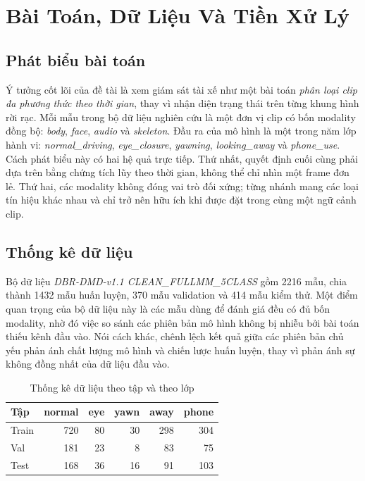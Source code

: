 \documentclass[conference,a4paper]{IEEEtran}
\begin{document}
\section[Bai Toan Du Lieu Va Tien Xu Ly]{Bài Toán, Dữ Liệu Và Tiền Xử Lý}
\subsection{Phát biểu bài toán}
Ý tưởng cốt lõi của đề tài là xem giám sát tài xế như một bài toán \textit{phân loại clip đa phương thức theo thời gian}, thay vì nhận diện trạng thái trên từng khung hình rời rạc. Mỗi mẫu trong bộ dữ liệu nghiên cứu là một đơn vị clip có bốn modality đồng bộ: \textit{body}, \textit{face}, \textit{audio} và \textit{skeleton}. Đầu ra của mô hình là một trong năm lớp hành vi: \textit{normal\_driving}, \textit{eye\_closure}, \textit{yawning}, \textit{looking\_away} và \textit{phone\_use}. Cách phát biểu này có hai hệ quả trực tiếp. Thứ nhất, quyết định cuối cùng phải dựa trên bằng chứng tích lũy theo thời gian, không thể chỉ nhìn một frame đơn lẻ. Thứ hai, các modality không đóng vai trò đối xứng; từng nhánh mang các loại tín hiệu khác nhau và chỉ trở nên hữu ích khi được đặt trong cùng một ngữ cảnh clip.

\subsection{Thống kê dữ liệu}
Bộ dữ liệu \textit{DBR-DMD-v1.1 CLEAN\_FULLMM\_5CLASS} gồm 2216 mẫu, chia thành 1432 mẫu huấn luyện, 370 mẫu validation và 414 mẫu kiểm thử. Một điểm quan trọng của bộ dữ liệu này là các mẫu dùng để đánh giá đều có đủ bốn modality, nhờ đó việc so sánh các phiên bản mô hình không bị nhiễu bởi bài toán thiếu kênh đầu vào. Nói cách khác, chênh lệch kết quả giữa các phiên bản chủ yếu phản ánh chất lượng mô hình và chiến lược huấn luyện, thay vì phản ánh sự không đồng nhất của dữ liệu đầu vào.

\begin{table}[t]
\caption{Thống kê dữ liệu theo tập và theo lớp}
\label{tab:data-stats}
\centering
\small
\begin{tabular}{lrrrrr}
\toprule
Tập & normal & eye & yawn & away & phone \\
\midrule
Train & 720 & 80 & 30 & 298 & 304 \\
Val & 181 & 23 & 8 & 83 & 75 \\
Test & 168 & 36 & 16 & 91 & 103 \\
\bottomrule
\end{tabular}
\end{table}
\end{document}
